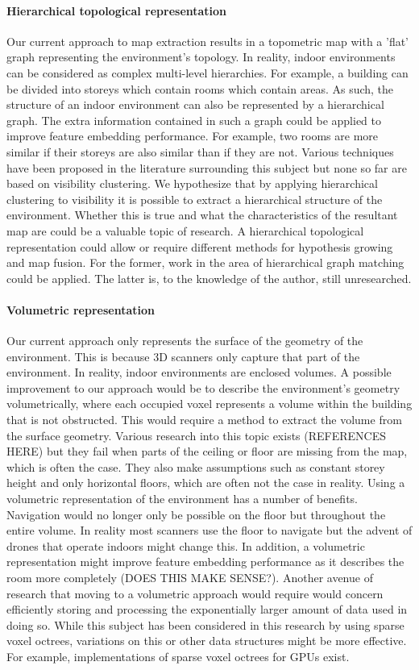 \paragraph{Hierarchical topological representation}
Our current approach to map extraction results in a topometric map with a 'flat' graph representing the environment's topology. In reality, indoor environments can be considered as complex multi-level hierarchies. For example, a building can be divided into storeys which contain rooms which contain areas. As such, the structure of an indoor environment can also be represented by a hierarchical graph. The extra information contained in such a graph could be applied to improve feature embedding performance. For example, two rooms are more similar if their storeys are also similar than if they are not. Various techniques have been proposed in the literature surrounding this subject but none so far are based on visibility clustering. We hypothesize that by applying hierarchical clustering to visibility it is possible to extract a hierarchical structure of the environment. Whether this is true and what the characteristics of the resultant map are could be a valuable topic of research. A hierarchical topological representation could allow or require different methods for hypothesis growing and map fusion. For the former, work in the area of hierarchical graph matching could be applied. The latter is, to the knowledge of the author, still unresearched. 

\paragraph{Volumetric representation}
Our current approach only represents the surface of the geometry of the environment. This is because 3D scanners only capture that part of the environment. In reality, indoor environments are enclosed volumes. A possible improvement to our approach would be to describe the environment's geometry volumetrically, where each occupied voxel represents a volume within the building that is not obstructed. This would require a method to extract the volume from the surface geometry. Various research into this topic exists (REFERENCES HERE) but they fail when parts of the ceiling or floor are missing from the map, which is often the case. They also make assumptions such as constant storey height and only horizontal floors, which are often not the case in reality. Using a volumetric representation of the environment has a number of benefits. Navigation would no longer only be possible on the floor but throughout the entire volume. In reality most scanners use the floor to navigate but the advent of drones that operate indoors might change this. In addition, a volumetric representation might improve feature embedding performance as it describes the room more completely (DOES THIS MAKE SENSE?). Another avenue of research that moving to a volumetric approach would require would concern efficiently storing and processing the exponentially larger amount of data used in doing so. While this subject has been considered in this research by using sparse voxel octrees, variations on this or other data structures might be more effective. For example, implementations of sparse voxel octrees for GPUs exist.
